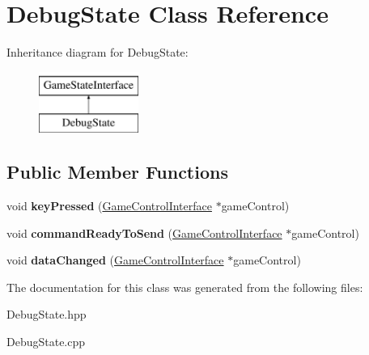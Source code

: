 \hypertarget{class_debug_state}{}\section{Debug\+State Class Reference}
\label{class_debug_state}
Inheritance diagram for Debug\+State\+:\begin{figure}[H]
\begin{center}
\leavevmode
\includegraphics[height=2.000000cm]{class_debug_state}
\end{center}
\end{figure}
\subsection*{Public Member Functions}
\begin{DoxyCompactItemize}
\item 
void {\bfseries key\+Pressed} (\hyperlink{class_game_control_interface}{Game\+Control\+Interface} $\ast$game\+Control)\hypertarget{class_debug_state_a7cd5357f1359c3f52d284643eb143a1a}{}\label{class_debug_state_a7cd5357f1359c3f52d284643eb143a1a}

\item 
void {\bfseries command\+Ready\+To\+Send} (\hyperlink{class_game_control_interface}{Game\+Control\+Interface} $\ast$game\+Control)\hypertarget{class_debug_state_a9c99fe8d4279728dea0f8ca1cbc3e56e}{}\label{class_debug_state_a9c99fe8d4279728dea0f8ca1cbc3e56e}

\item 
void {\bfseries data\+Changed} (\hyperlink{class_game_control_interface}{Game\+Control\+Interface} $\ast$game\+Control)\hypertarget{class_debug_state_ae9af861600b5300dc27a1a7a15ba88c0}{}\label{class_debug_state_ae9af861600b5300dc27a1a7a15ba88c0}

\end{DoxyCompactItemize}


The documentation for this class was generated from the following files\+:\begin{DoxyCompactItemize}
\item 
Debug\+State.\+hpp\item 
Debug\+State.\+cpp\end{DoxyCompactItemize}
